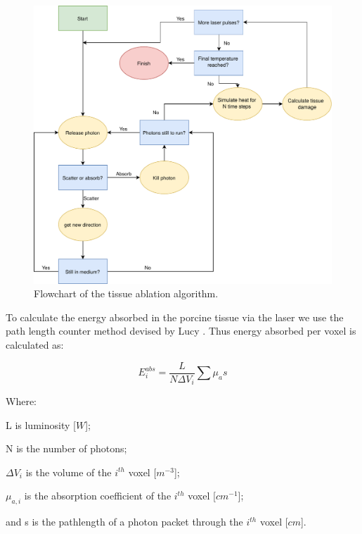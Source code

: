 \begin{figure}
\centering
\includegraphics[scale=0.5]{./ablation/images/flowchart.pdf}
\caption{Flowchart of the tissue ablation algorithm.}
\label{fig:algo}
\end{figure}

To calculate the energy absorbed in the porcine tissue via the laser we use the path length counter method devised by Lucy \cite{lucy1999computing}. Thus energy absorbed per voxel is calculated as:

\begin{equation}
E_{i}^{abs} = \frac{L}{N \Delta V_i}\sum\mu_a s
\label{eqn:Eabs}
\end{equation}

\noindent Where:

	\indent L is luminosity [$W$];
	
	\indent N is the number of photons;
	
	\indent $\Delta V_i$ is the volume of the $i^{th}$ voxel [$m^{-3}$];
	
	\indent $\mu_{a,i}$ is the absorption coefficient of the $i^{th}$ voxel [$cm^{-1}$];
	
	\indent and s is the pathlength of a photon packet through the $i^{th}$ voxel [$cm$].
	
	\medskip
	
